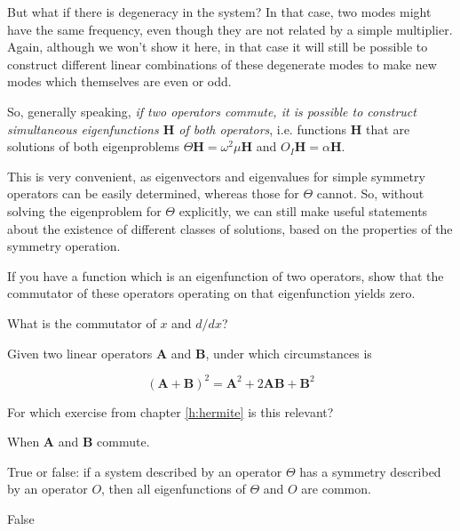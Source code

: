 But what if there is degeneracy in the system? In that case, two modes might have the same frequency, even though they are not related by a simple multiplier. Again, although we won't show it here, in that case it will still be possible to construct different linear combinations of these degenerate modes to make new modes which themselves are even or odd.

So, generally speaking, \emph{if two operators commute, it is possible to construct simultaneous eigenfunctions ${\mathbf H}$ of both operators}, i.e. functions ${\mathbf H}$ that are solutions of both eigenproblems $\Theta {\mathbf H} = \omega^2 \mu {\mathbf H}$ and $O_I {\mathbf H} = \alpha {\mathbf H}$.

This is very convenient, as eigenvectors and eigenvalues for simple symmetry operators can be easily determined, whereas those for $\Theta$ cannot. So, without solving the eigenproblem for $\Theta$ explicitly, we can still make useful statements about the existence of different classes of solutions, based on the properties of the symmetry operation.

\begin{exer}
  If you have a function which is an eigenfunction of two operators, show that the commutator of these operators operating on that eigenfunction yields zero.
\end{exer}

\begin{exer}
What is the commutator of $x$ and $d/dx$?  
\end{exer}

\begin{exer}
Given two linear operators $\mathbf A$ and $\mathbf B$, under which circumstances is

$$\left ( {\mathbf A} + {\mathbf B} \right ) ^2 =  {\mathbf A}^2 + 2 {\mathbf A}{\mathbf B}  + {\mathbf B}^2$$

For which exercise from chapter \ref{h:hermite} is this relevant?
\begin{sol}
When $\mathbf A$ and $\mathbf B$ commute.
\end{sol}
\end{exer}

\begin{exer}
True or false: if a system described by an operator $\Theta$ has a symmetry described by an operator $O$, then all eigenfunctions of $\Theta$ and $O$ are common.
  \begin{sol}
    False
\end{sol}  
\end{exer}


